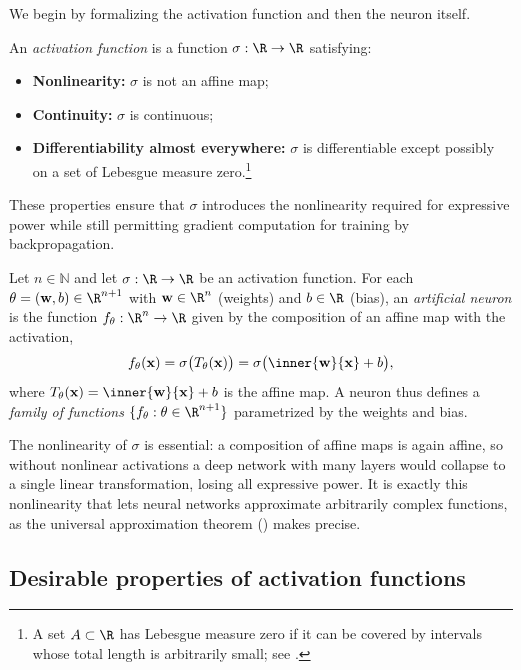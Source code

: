 We begin by formalizing the activation function and then the neuron itself.

\begin{definition}
\label{def:found:activation}
An \emph{activation function} is a function $\sigma : \R \to \R$ satisfying:
\begin{itemize}
  \item \textbf{Nonlinearity:} $\sigma$ is not an affine map;
  \item \textbf{Continuity:} $\sigma$ is continuous;
  \item \textbf{Differentiability almost everywhere:} $\sigma$ is differentiable
    except possibly on a set of Lebesgue measure zero.\footnote{A set
    $A \subset \R$ has Lebesgue measure zero if it can be covered by intervals
    whose total length is arbitrarily small; see .}
\end{itemize}
\end{definition}

These properties ensure that $\sigma$ introduces the nonlinearity required for
expressive power while still permitting gradient computation for training by
backpropagation.

\begin{definition}
\label{def:found:neuron}
Let $n \in \mathbb{N}$ and let $\sigma : \R \to \R$ be an activation function.
For each $\theta = (\mathbf{w}, b) \in \R^{n+1}$ with $\mathbf{w} \in \R^n$
(weights) and $b \in \R$ (bias), an \emph{artificial neuron} is the function
$f_\theta : \R^n \to \R$ given by the composition of an affine map with the
activation,
\[
  f_\theta(\mathbf{x}) = \sigma\bigl(T_\theta(\mathbf{x})\bigr)
  = \sigma\bigl(\inner{\mathbf{w}}{\mathbf{x}} + b\bigr),
\]
where $T_\theta(\mathbf{x}) = \inner{\mathbf{w}}{\mathbf{x}} + b$ is the affine
map. A neuron thus defines a \emph{family of functions}
$\{f_\theta : \theta \in \R^{n+1}\}$ parametrized by the weights and bias.
\end{definition}

The nonlinearity of $\sigma$ is essential: a composition of affine maps is again
affine, so without nonlinear activations a deep network with many layers would
collapse to a single linear transformation, losing all expressive power. It is
exactly this nonlinearity that lets neural networks approximate arbitrarily
complex functions, as the universal approximation theorem
() makes precise.

\subsection{Desirable properties of activation functions}
\label{sec:found:activation-properties}

